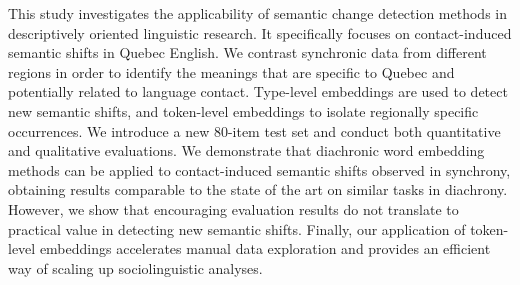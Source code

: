 This study investigates the applicability of semantic change detection methods in descriptively oriented linguistic research. It specifically focuses on contact-induced semantic shifts in Quebec English. We contrast synchronic data from different regions in order to identify the meanings that are specific to Quebec and potentially related to language contact. Type-level embeddings are used to detect new semantic shifts, and token-level embeddings to isolate regionally specific occurrences. We introduce a new 80-item test set and conduct both quantitative and qualitative evaluations. We demonstrate that diachronic word embedding methods can be applied to contact-induced semantic shifts observed in synchrony, obtaining results comparable to the state of the art on similar tasks in diachrony. However, we show that encouraging evaluation results do not translate to practical value in detecting new semantic shifts. Finally, our application of token-level embeddings accelerates manual data exploration and provides an efficient way of scaling up sociolinguistic analyses.
